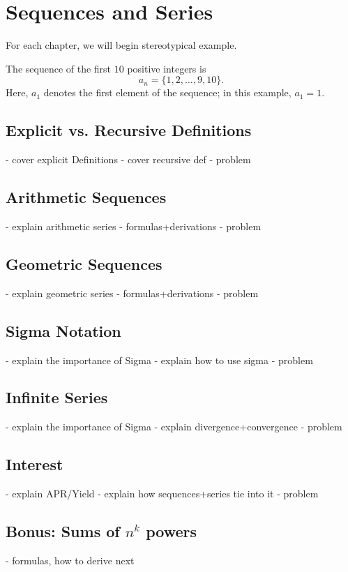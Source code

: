 \chapter{Sequences and Series}

For each chapter, we will begin stereotypical example.
\begin{example}
    The sequence of the first $10$ positive integers is
    \[a_n=\{1,2,\dots,9,10\}.\]
    Here, $a_1$ denotes the first element of the sequence; in this example, $a_1=1$.
\end{example}
\section{Explicit vs. Recursive Definitions}
- cover explicit Definitions
- cover recursive def 
- problem
\section{Arithmetic Sequences}
- explain arithmetic series
- formulas+derivations
- problem
\section{Geometric Sequences}
- explain geometric series
- formulas+derivations
- problem
\section{Sigma Notation}
- explain the importance of Sigma
- explain how to use sigma
- problem
\section{Infinite Series}
- explain the importance of Sigma
- explain divergence+convergence
- problem
\section{Interest}
- explain APR/Yield
- explain how sequences+series tie into it
- problem 

\begin{subappendices}
\section{Bonus: Sums of $n^k$ powers}
    - formulas, how to derive next
\end{subappendices}